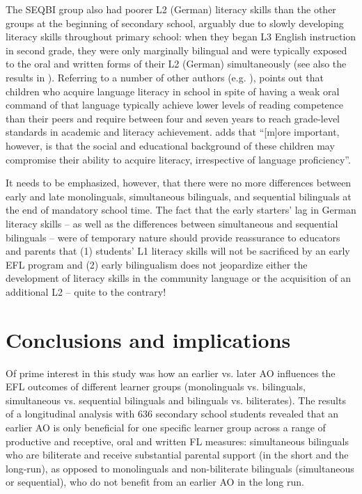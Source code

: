 \documentclass[output=paper,modfonts,nonflat,newtxmath]{langsci/langscibook}
\begin{document}
The SEQBI group also had poorer L2 (German) literacy skills than the other groups at the beginning of secondary school, arguably due to slowly developing literacy skills throughout primary school: when they began L3 English instruction in second grade, they were only marginally bilingual and were typically exposed to the oral and written forms of their L2 (German) simultaneously (see also the results in \citealt{SánchezBardel2017}). Referring to a number of other authors (e.g. \citealt{Collier1987, Cummins1991, AugustHakuta1997}), \citet{Bialystok2007} points out that children who acquire language literacy in school in spite of having a weak oral command of that language typically achieve lower levels of reading competence than their peers and require between four and seven years to reach grade-level standards in academic and literacy achievement. \citet[22]{Bialystok2007} adds that “[m]ore important, however, is that the social and educational background of these children may compromise their ability to acquire literacy, irrespective of language proficiency”.

It needs to be emphasized, however, that there were no more differences between early and late monolinguals, simultaneous bilinguals, and sequential bilinguals at the end of mandatory school time. The fact that the early starters’ lag in German literacy skills – as well as the differences between simultaneous and sequential bilinguals – were of temporary nature should provide reassurance to educators and parents that (1) students’ L1 literacy skills will not be sacrificed by an early EFL program and (2) early bilingualism does not jeopardize either the development of literacy skills in the community language or the acquisition of an additional L2 – quite to the contrary!\\

\section{Conclusions and implications}
\label{sec:pfenninger:6}

Of prime interest in this study was how an earlier vs. later AO influences the EFL outcomes of different learner groups (monolinguals vs. bilinguals, simultaneous vs. sequential bilinguals and bilinguals vs. biliterates). The results of a longitudinal analysis with 636 secondary school students revealed that an earlier AO is only beneficial for one specific learner group across a range of productive and receptive, oral and written FL measures: simultaneous bilinguals who are biliterate and receive substantial parental support (in the short and the long-run), as opposed to monolinguals and non-biliterate bilinguals (simultaneous or sequential), who do not benefit from an earlier AO in the long run.
\end{document}
